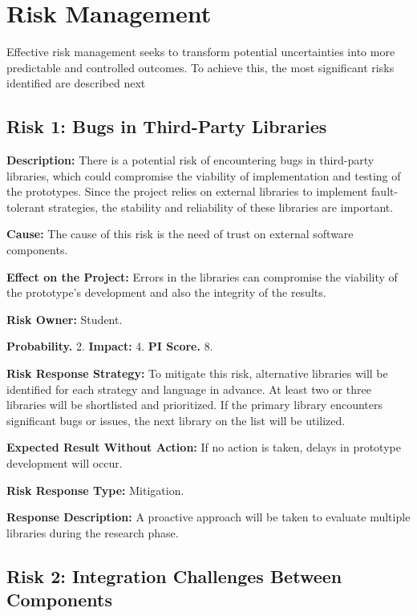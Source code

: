 \section{Risk Management}

Effective risk management seeks to transform potential uncertainties into more predictable and controlled outcomes. To achieve this, the most significant risks identified are described next

\subsection{Risk 1: Bugs in Third-Party Libraries}

\textbf{Description:} There is a potential risk of encountering bugs in third-party libraries, which could compromise the viability of implementation and testing of the prototypes. Since the project relies on external libraries to implement fault-tolerant strategies, the stability and reliability of these libraries are important.

\textbf{Cause:} The cause of this risk is the need of trust on external software components.

\textbf{Effect on the Project:} Errors in the libraries can compromise the viability of the prototype's development and also the integrity of the results.

\textbf{Risk Owner:} Student.

\textbf{Probability.} 2. \textbf{Impact:} 4. \textbf{PI Score.} 8.

\textbf{Risk Response Strategy:} To mitigate this risk, alternative libraries will be identified for each strategy and language in advance. At least two or three libraries will be shortlisted and prioritized. If the primary library encounters significant bugs or issues, the next library on the list will be utilized.

\textbf{Expected Result Without Action:} If no action is taken, delays in prototype development will occur.

\textbf{Risk Response Type:} Mitigation.

\textbf{Response Description:} A proactive approach will be taken to evaluate multiple libraries during the research phase.


\subsection{Risk 2: Integration Challenges Between Components}

